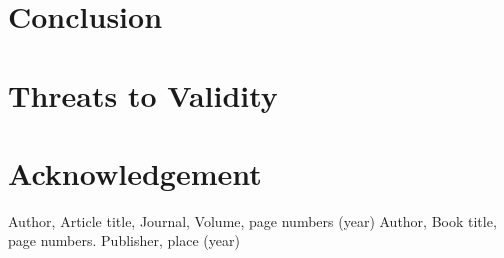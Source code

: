 \section{Conclusion}

\section{Threats to Validity}

\section{Acknowledgement}







\begin{thebibliography}{}
%
%
Author, Article title, Journal, Volume, page numbers (year)
Author, Book title, page numbers. Publisher, place (year)
\end{thebibliography}



